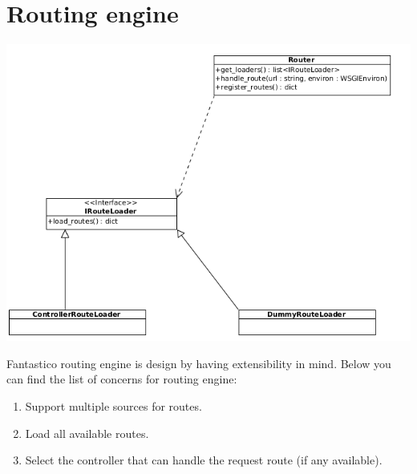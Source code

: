 \documentclass[letterpaper,10pt,english]{sphinxmanual}
\begin{document}
\section{Routing engine}
\label{features/routing_engine:routing-engine}\label{features/routing_engine::doc}
\includegraphics{routing_engine.png}

Fantastico routing engine is design by having extensibility in mind. Below you can find the list of concerns for routing engine:
\begin{enumerate}
\item {} 
Support multiple sources for routes.

\item {} 
Load all available routes.

\item {} 
Select the controller that can handle the request route (if any available).

\end{enumerate}
\end{document}

